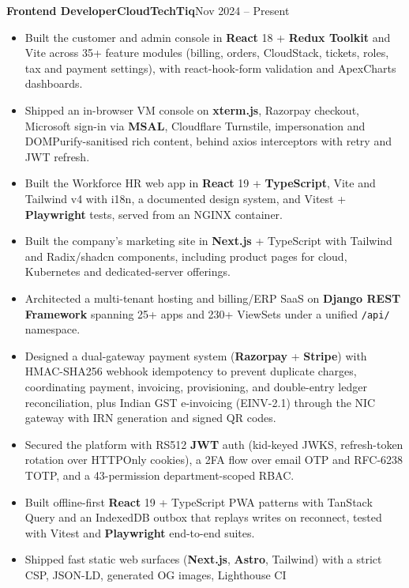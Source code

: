 \documentclass[11pt,a4paper]{article}
\newcommand{\entry}[3]{%
  \vspace{4.5pt}\noindent\textbf{#1}\hfill\textbf{#2}\hfill{\color{subtlegray}#3}\par\vspace{2pt}}
\begin{document}
\entry{Frontend Developer}{CloudTechTiq}{Nov 2024 -- Present}
\begin{itemize}
  \item Built the customer and admin console in \textbf{React} 18 +
        \textbf{Redux Toolkit} and Vite across 35+ feature modules (billing,
        orders, CloudStack, tickets, roles, tax and payment settings), with
        react-hook-form validation and ApexCharts dashboards.
  \item Shipped an in-browser VM console on \textbf{xterm.js}, Razorpay
        checkout, Microsoft sign-in via \textbf{MSAL}, Cloudflare Turnstile,
        impersonation and DOMPurify-sanitised rich content, behind
        axios interceptors with retry and JWT refresh.
  \item Built the Workforce HR web app in \textbf{React} 19 +
        \textbf{TypeScript}, Vite and Tailwind v4 with i18n, a documented design
        system, and Vitest + \textbf{Playwright} tests, served from an NGINX
        container.
  \item Built the company's marketing site in \textbf{Next.js} +
        TypeScript with Tailwind and Radix/shadcn components, including
        product pages for cloud, Kubernetes and dedicated-server offerings.
  \item Architected a multi-tenant hosting and billing/ERP SaaS on \textbf{Django
        REST Framework} spanning 25+ apps and 230+ ViewSets under a unified
        \texttt{/api/} namespace.
  \item Designed a dual-gateway payment system (\textbf{Razorpay} +
        \textbf{Stripe}) with HMAC-SHA256 webhook idempotency to prevent duplicate
        charges, coordinating payment, invoicing, provisioning, and double-entry
        ledger reconciliation, plus Indian GST e-invoicing (EINV-2.1) through the
        NIC gateway with IRN generation and signed QR codes.
  \item Secured the platform with RS512 \textbf{JWT} auth (kid-keyed JWKS,
        refresh-token rotation over HTTPOnly cookies), a 2FA flow over email OTP
        and RFC-6238 TOTP, and a 43-permission department-scoped RBAC.
  \item Built offline-first \textbf{React} 19 + TypeScript PWA
        patterns with TanStack Query and an IndexedDB outbox that replays writes
        on reconnect, tested with Vitest and \textbf{Playwright} end-to-end suites.
  \item Shipped fast static web surfaces (\textbf{Next.js}, \textbf{Astro},
        Tailwind) with a strict CSP, JSON-LD, generated OG images, Lighthouse CI

\end{itemize}
\end{document}
